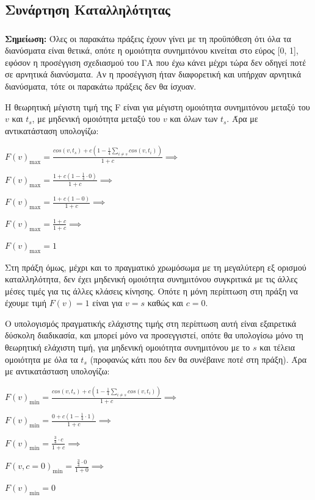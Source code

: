 \documentclass[12pt,a4paper]{article}
\begin{document}
\subsection{Συνάρτηση Καταλληλότητας}

\subsubsection{}

\textbf{Σημείωση:} Όλες οι παρακάτω πράξεις έχουν γίνει με τη προϋπόθεση ότι όλα τα διανύσματα είναι θετικά, οπότε η ομοιότητα συνημιτόνου κινείται στο εύρος [0, 1], εφόσον η προσέγγιση σχεδιασμού του ΓΑ που έχω κάνει μέχρι τώρα δεν οδηγεί ποτέ σε αρνητικά διανύσματα. Αν η προσέγγιση ήταν διαφορετική και υπήρχαν αρνητικά διανύσματα, τότε οι παρακάτω πράξεις δεν θα ίσχυαν.

Η θεωρητική μέγιστη τιμή της F είναι για μέγιστη ομοιότητα συνημιτόνου μεταξύ του $v$ και $t_s$, με μηδενική ομοιότητα μεταξύ του $v$ και όλων των $t_s$. Άρα με αντικατάσταση υπολογίζω:

\begin{center}
    $F(v)_\mathrm{max} = \frac{cos(v,t_s) + c(1-\frac{1}{4}\sum_{i\neq s}cos(v,t_i))}{1+c} \implies$

    $F(v)_\mathrm{max} = \frac{1 + c(1-\frac{1}{4}\cdot0)}{1+c} \implies$

    $F(v)_\mathrm{max} = \frac{1 + c(1-0)}{1+c} \implies$

    $F(v)_\mathrm{max} = \frac{1 + c}{1+c} \implies$

    $F(v)_\mathrm{max} = 1$
\end{center}

Στη πράξη όμως, μέχρι και το πραγματικό χρωμόσωμα με τη μεγαλύτερη εξ ορισμού καταλληλότητα, δεν έχει μηδενική ομοιότητα συνημιτόνου συγκριτικά με τις άλλες μέσες τιμές για τις άλλες κλάσεις κίνησης. Οπότε η μόνη περίπτωση στη πράξη να έχουμε τιμή $F(v) = 1$ είναι για $v = s$ καθώς και $c = 0$.

Ο υπολογισμός πραγματικής ελάχιστης τιμής στη περίπτωση αυτή είναι εξαιρετικά δύσκολη διαδικασία, και μπορεί μόνο να προσεγγιστεί, οπότε θα υπολογίσω μόνο τη θεωρητική ελάχιστη τιμή, για μηδενική ομοιότητα συνημιτόνου με το $s$ και τέλεια ομοιότητα με όλα τα $t_s$ (προφανώς κάτι που δεν θα συνέβαινε ποτέ στη πράξη). Άρα με αντικατάσταση υπολογίζω:

\begin{center}
    $F(v)_\mathrm{min} = \frac{cos(v,t_s) + c(1-\frac{1}{4}\sum_{i\neq s}cos(v,t_i))}{1+c} \implies$

    $F(v)_\mathrm{min} = \frac{0 + c(1-\frac{1}{4}\cdot1)}{1+c} \implies$

    $F(v)_\mathrm{min} = \frac{\frac{3}{4}\cdot c}{1+c} \implies$

    $F(v, c = 0)_\mathrm{min} = \frac{\frac{3}{4}\cdot 0}{1+0} \implies$

    $F(v)_\mathrm{min} = 0$
\end{center}
\end{document}
